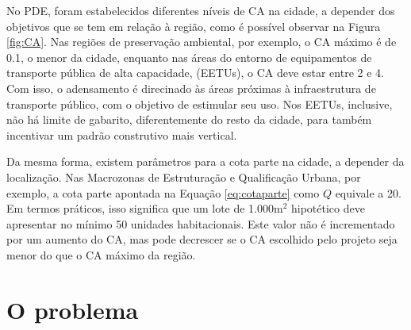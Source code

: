 No PDE, foram estabelecidos diferentes níveis de CA na cidade, a depender dos objetivos que se tem em relação à região, como é possível observar na Figura \ref{fig:CA}. Nas regiões de preservação ambiental, por exemplo, o CA máximo é de 0.1, o menor da cidade, enquanto nas áreas do entorno de equipamentos de transporte pública de alta capacidade, (EETUs), o CA deve estar entre 2 e 4. Com isso, o adensamento é direcinado às áreas próximas à infraestrutura de transporte público, com o objetivo de estimular seu uso. Nos EETUs, inclusive, não há limite de gabarito, diferentemente do resto da cidade, para também incentivar um padrão construtivo mais vertical.

Da mesma forma, existem parâmetros para a cota parte na cidade, a depender da localização. Nas Macrozonas de Estruturação e Qualificação Urbana, por exemplo, a cota parte apontada na Equação \ref{eq:cotaparte} como $Q$ equivale a 20. Em termos práticos, isso significa que um lote de 1.000m$^2$ hipotético deve apresentar no mínimo 50 unidades habitacionais. Este valor não é incrementado por um aumento do CA, mas pode decrescer se o CA escolhido pelo projeto seja menor do que o CA máximo da região.


\section{O problema}


